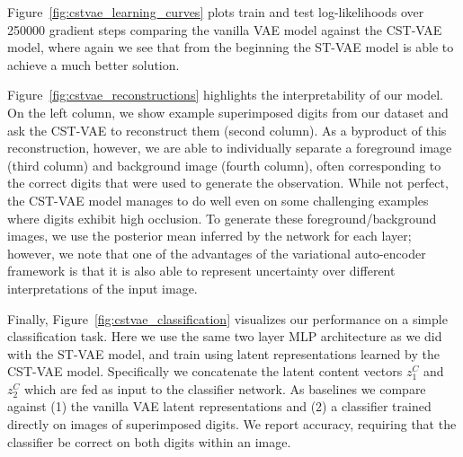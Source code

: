 Figure~\ref{fig:cstvae_learning_curves}
plots train and test log-likelihoods over 250000 gradient steps
comparing the vanilla VAE model against the CST-VAE model, where again
we see that from the beginning the ST-VAE
model is able to achieve a much better solution. 

Figure~\ref{fig:cstvae_reconstructions} highlights the interpretability of our model.
On the left column, we show example superimposed digits from our dataset and ask the 
CST-VAE to reconstruct them (second column).  As a byproduct of this reconstruction, however,
we are able to individually separate a foreground image (third column) and background image (fourth column),
often corresponding to the correct digits that were used to generate the observation.  
 While not perfect, the CST-VAE model manages to do well even on some challenging examples where
 digits exhibit high occlusion.  To generate these foreground/background images, we use the posterior mean
 inferred by the network for each layer; however, we note that one of the advantages of the 
 variational auto-encoder framework is that it is also able to represent uncertainty over different interpretations
 of the input image.

Finally, Figure~\ref{fig:cstvae_classification} visualizes our performance on a simple classification task.
Here we use the same two layer MLP architecture as we did with the ST-VAE model, and train using latent representations
learned by the CST-VAE model.  Specifically we concatenate the latent content vectors $z^C_1$ and $z^C_2$
which are fed as input to the classifier network.  As baselines we compare against (1) the vanilla VAE latent representations 
and (2) a classifier trained directly on images of superimposed digits.  We report accuracy, requiring that the classifier
be correct on both digits within an image.





